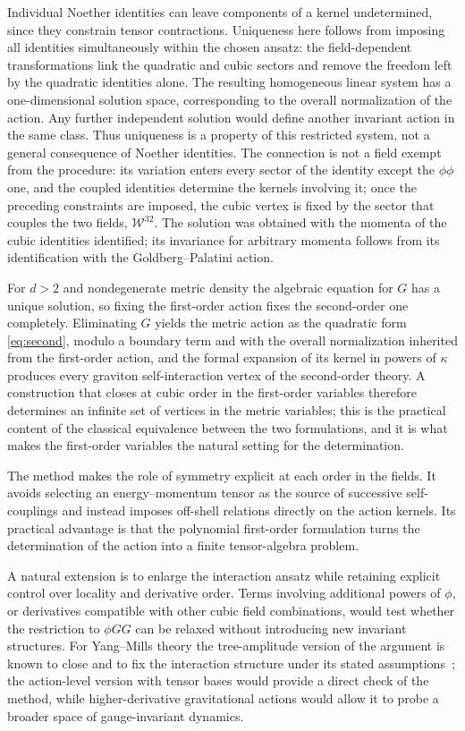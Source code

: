 \documentclass[prd,aps,preprint,superscriptaddress,nofootinbib,amsmath,amssymb,eqsecnum]{revtex4-2}
\newcommand{\W}{\mathcal{W}}
\begin{document}
Individual Noether identities can leave components of a kernel undetermined, since they
constrain tensor contractions. Uniqueness here follows from imposing all identities
simultaneously within the chosen ansatz: the field-dependent transformations link the
quadratic and cubic sectors and remove the freedom left by the quadratic identities alone.
The resulting homogeneous linear system has a one-dimensional solution space, corresponding
to the overall normalization of the action. Any further independent solution would define
another invariant action in the same class. Thus uniqueness is a property of this restricted
system, not a general consequence of Noether identities. The connection is not a field
exempt from the procedure: its variation enters every sector of the identity except the
$\phi\phi$ one, and the coupled identities determine the kernels involving it; once the
preceding constraints are imposed, the cubic vertex is fixed by the sector that couples the
two fields, $\W^{32}$. The solution was obtained with the
momenta of the cubic identities identified; its invariance for arbitrary momenta follows
from its identification with the Goldberg--Palatini action.

For $d>2$ and nondegenerate metric density the algebraic equation for $G$ has a unique
solution, so fixing the first-order action fixes the second-order one completely.
Eliminating $G$ yields the metric action as the quadratic form \eqref{eq:second}, modulo a
boundary term and with the overall normalization inherited from the first-order action, and
the formal expansion of its kernel in powers of $\kappa$ produces every graviton
self-interaction vertex of the second-order theory. A construction that closes at cubic
order in the first-order variables therefore determines an infinite set of vertices in the
metric variables; this is the practical content of the classical equivalence between the two
formulations, and it is what makes the first-order variables the natural setting for the
determination.

The method makes the role of symmetry explicit at each order in the fields. It avoids
selecting an energy--momentum tensor as the source of successive self-couplings and instead
imposes off-shell relations directly on the action kernels. Its practical advantage is that
the polynomial first-order formulation turns the determination of the action into a finite tensor-algebra
problem.

A natural extension is to enlarge the interaction ansatz while retaining explicit control
over locality and derivative order. Terms involving additional powers of $\phi$, or
derivatives compatible with other cubic field combinations, would test whether the
restriction to $\phi GG$ can be relaxed without introducing new invariant structures.
For Yang--Mills theory the tree-amplitude version of the argument is known to close and
to fix the interaction structure under its stated assumptions~\cite{BrandtFrenkel1996}; the
action-level version with tensor bases would provide a direct check of the method, while higher-derivative gravitational
actions would allow it to probe a broader space of gauge-invariant dynamics.
\end{document}
